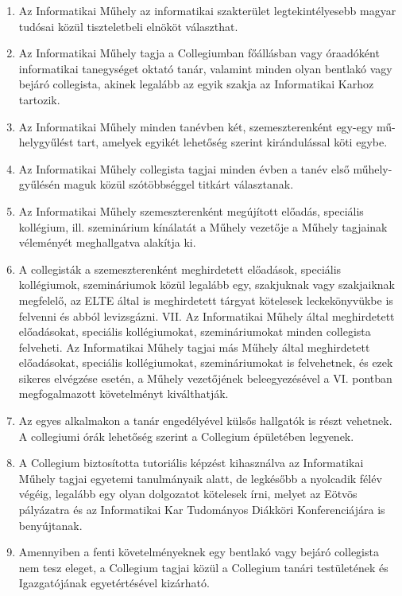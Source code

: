 \documentclass{rulebook}
\begin{document}
\begin{enumerate}
	\item Az Informatikai Műhely az informatikai szakterület legtekintélyesebb magyar tudósai közül tiszteletbeli elnököt választhat.
	\item Az Informatikai Műhely tagja a Collegiumban főállásban vagy óraadóként informatikai tanegységet oktató tanár, valamint minden olyan bentlakó vagy bejáró collegista, akinek legalább az egyik szakja az Informatikai Karhoz tartozik.
	\item Az Informatikai Műhely minden tanévben két, szemeszterenként egy-egy mű-helygyűlést tart, amelyek egyikét lehetőség szerint kirándulással köti egybe.
	\item Az Informatikai Műhely collegista tagjai minden évben a tanév első műhely-gyűlésén maguk közül szótöbbséggel titkárt választanak.
	\item Az Informatikai Műhely szemeszterenként megújított előadás, speciális kollégium, ill. szeminárium kínálatát a Műhely vezetője a Műhely tagjainak véleményét meghallgatva alakítja ki.
	\item A collegisták a szemeszterenként meghirdetett előadások, speciális kollégiumok, szemináriumok közül legalább egy, szakjuknak vagy szakjaiknak megfelelő, az ELTE által is meghirdetett tárgyat kötelesek leckekönyvükbe is felvenni és abból levizsgázni. VII. Az Informatikai Műhely által meghirdetett előadásokat, speciális kollégiumokat, szemináriumokat minden collegista felveheti. Az Informatikai Műhely tagjai más Műhely által meghirdetett előadásokat, speciális kollégiumokat, szemináriumokat is felvehetnek, és ezek sikeres elvégzése esetén, a Műhely vezetőjének beleegyezésével a VI. pontban megfogalmazott követelményt kiválthatják.
	\item Az egyes alkalmakon a tanár engedélyével külsős hallgatók is részt vehetnek. A collegiumi órák lehetőség szerint a Collegium épületében legyenek.
	\item A Collegium biztosította tutoriális képzést kihasználva az Informatikai Műhely tagjai egyetemi tanulmányaik alatt, de legkésőbb a nyolcadik félév végéig, legalább egy olyan dolgozatot kötelesek írni, melyet az Eötvös pályázatra és az Informatikai Kar Tudományos Diákköri Konferenciájára is benyújtanak.
	\item Amennyiben a fenti követelményeknek egy bentlakó vagy bejáró collegista nem tesz eleget, a Collegium tagjai közül a Collegium tanári testületének és Igazgatójának egyetértésével kizárható.
\end{enumerate}
\end{document}
